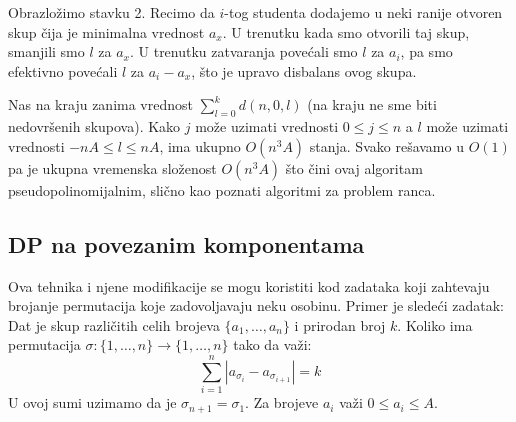 \documentclass[a4paper,12pt]{article}
\numberwithin{equation}{subsection}
\begin{document}
Obrazlo\v zimo stavku 2. Recimo da $i$-tog studenta dodajemo u neki ranije otvoren skup \v cija je minimalna vrednost $a_x$. U trenutku kada smo otvorili taj skup, smanjili smo $l$ za $a_x$. U trenutku zatvaranja pove\' cali smo $l$ za $a_i$, pa smo efektivno pove\' cali $l$ za $a_i - a_x$, \v sto je upravo disbalans ovog skupa.

Nas na kraju zanima vrednost $\sum_{l=0}^{k} d(n, 0, l)$ (na kraju ne sme biti nedovr\v senih skupova). Kako $j$ mo\v ze uzimati vrednosti $0 \leq j \leq n$ a $l$ mo\v ze uzimati vrednosti $-nA \leq l \leq nA$, ima ukupno $O(n^3 A)$ stanja. Svako re\v savamo u $O(1)$ pa je ukupna vremenska slo\v zenost $O(n^3 A)$ \v sto \v cini ovaj algoritam pseudopolinomijalnim, sli\v cno kao poznati algoritmi za problem ranca.

\subsection{DP na povezanim komponentama}

Ova tehnika i njene modifikacije se mogu koristiti kod zadataka koji zahtevaju brojanje permutacija koje zadovoljavaju neku osobinu. Primer je slede\' ci zadatak:
\\

Dat je skup razli\v citih celih brojeva $\{a_1, \ldots, a_n \}$ i prirodan broj $k$. Koliko ima permutacija $\sigma : \{1, \ldots, n\} \rightarrow \{1, \ldots, n\} $ tako da va\v zi:
$$
	\sum_{i=1}^n |a_{\sigma_i} - a_{\sigma_{i+1}}| = k
$$
U ovoj sumi uzimamo da je $\sigma_{n+1} = \sigma_1$. Za brojeve $a_i$ va\v zi $0 \leq a_i \leq A$.
\\
\end{document}
